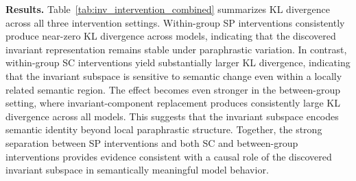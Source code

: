 \textbf{Results.}
Table~\ref{tab:inv_intervention_combined} summarizes KL divergence across all three intervention settings. Within-group SP interventions consistently produce near-zero KL divergence across models, indicating that the discovered invariant representation remains stable under paraphrastic variation. In contrast, within-group SC interventions yield substantially larger KL divergence, indicating that the invariant subspace is sensitive to semantic change even within a locally related semantic region. 
The effect becomes even stronger in the between-group setting, where invariant-component replacement produces consistently large KL divergence across all models. This suggests that the invariant subspace encodes semantic identity beyond local paraphrastic structure. Together, the strong separation between SP interventions and both SC and between-group interventions provides evidence consistent with a causal role of the discovered invariant subspace in semantically meaningful model behavior. 




